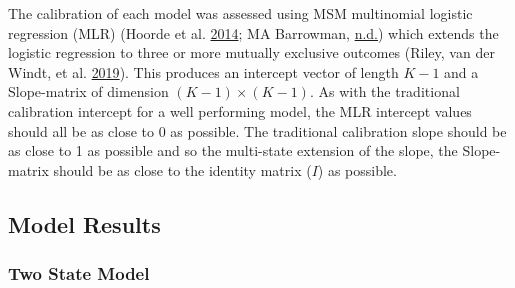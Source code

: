\documentclass[
]{article}
\begin{document}
The calibration of each model was assessed using MSM multinomial logistic regression (MLR) (Hoorde et al. \protect\hyperlink{ref-hoorde_assessing_2014}{2014}; MA Barrowman, \protect\hyperlink{ref-chap-performance-metrics}{n.d.}) which extends the logistic regression to three or more mutually exclusive outcomes (Riley, van der Windt, et al. \protect\hyperlink{ref-riley_prognosis_2019}{2019}). This produces an intercept vector of length \(K-1\) and a Slope-matrix of dimension \((K-1) \times (K-1)\). As with the traditional calibration intercept for a well performing model, the MLR intercept values should all be as close to 0 as possible. The traditional calibration slope should be as close to 1 as possible and so the multi-state extension of the slope, the Slope-matrix should be as close to the identity matrix (\(I\)) as possible.

\hypertarget{model-results}{%
\subsection{Model Results}\label{model-results}}

\hypertarget{two-state-model}{%
\subsubsection{Two State Model}\label{two-state-model}}
\end{document}
